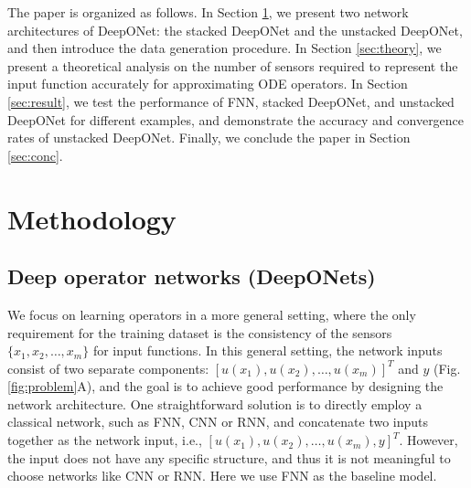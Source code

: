 \documentclass[11pt]{article}
\begin{document}
The paper is organized as follows. In Section \ref{sec:method}, we present two network architectures of DeepONet: the stacked DeepONet and the unstacked DeepONet, and then introduce the data generation procedure. In Section \ref{sec:theory}, we present a theoretical analysis on the number of sensors required to represent the input function accurately for approximating ODE operators. In Section \ref{sec:result}, we test the performance of FNN, stacked DeepONet, and unstacked DeepONet for different examples, and demonstrate the accuracy and convergence rates of unstacked DeepONet. Finally, we conclude the paper in Section \ref{sec:conc}.

\section{Methodology}
\label{sec:method}
\subsection{Deep operator networks (DeepONets)}
\label{sec:deeponet}

We focus on learning operators in a more general setting, where the only requirement for the training dataset is the consistency of the sensors $\{x_1, x_2, \dots, x_m\}$ for input functions. In this general setting, the network inputs consist of two separate components:  $[u(x_1), u(x_2), \dots, u(x_m)]^T$ and $y$ (Fig. \ref{fig:problem}A), and the goal is to achieve good performance by designing the network architecture. One straightforward solution is to directly employ a classical network, such as FNN, CNN or RNN, and concatenate two inputs together as the network input, i.e., $[u(x_1), u(x_2), \dots, u(x_m), y]^T$. However, the input does not have any specific structure, and thus it is not meaningful to choose networks like CNN or RNN. Here we use FNN as the baseline model.
\end{document}

